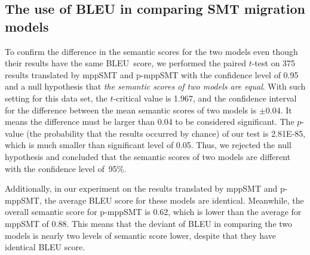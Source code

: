 \subsection{The use of BLEU in comparing SMT migration models}

To confirm the difference in the semantic scores for the two
models even though their results have the same BLEU~score, we performed the
paired $t$-test\cite{geek_2015} on 375 results translated by mppSMT and
p-mppSMT with the confidence level of
0.95 and a null hypothesis that {\em the semantic scores of two models
are equal}. With such setting for this data set, the $t$-critical value is 1.967,
and the confidence interval for the difference between the mean semantic scores
of two models is $\pm0.04$. It means the difference must be larger than 0.04 to
be considered significant. The $p$-value (the probability
that the results occurred by chance) of our test is 2.81E-85, which is much
smaller than significant level of 0.05. Thus, we rejected the null hypothesis and concluded
that the semantic scores of two models are different with the confidence
level of~95\%.

Additionally, in our experiment on the results translated by mppSMT
and p-mppSMT, the average BLEU score for these models are
identical. Meanwhile, the overall semantic score for p-mppSMT is 0.62,
which is lower than the average for mppSMT of 0.88. This means that
the deviant of BLEU in comparing the two models is nearly two
levels of semantic score lower, despite that they have identical BLEU
score.



